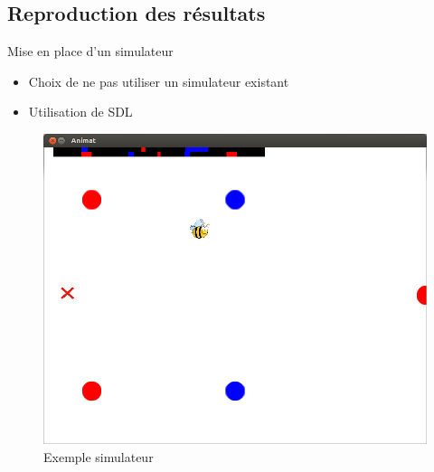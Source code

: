 \documentclass{beamer}
\begin{document}
\subsection{Reproduction des résultats}

\begin{frame}
  \begin{block}{Mise en place d'un simulateur}
    \begin{itemize}
      \item Choix de ne pas utiliser un simulateur existant
      \item Utilisation de SDL
    \end{itemize}
  \end{block}
  \begin{figure}
    \centering
    \includegraphics[scale=0.2]{one_run.png}
    \caption{Exemple simulateur}
  \end{figure}
\end{frame}
\end{document}
